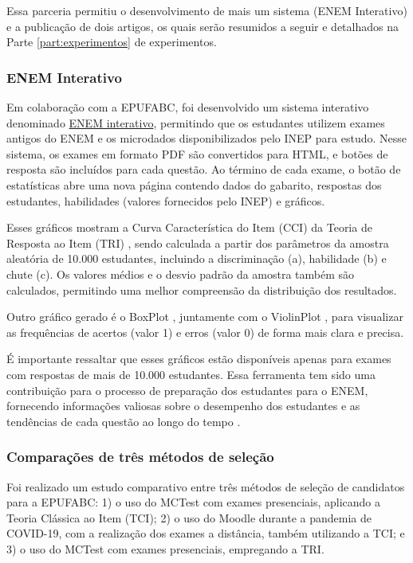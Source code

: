 Essa parceria permitiu o desenvolvimento de mais um sistema (ENEM Interativo) e a publicação de dois artigos, os quais serão resumidos a seguir e detalhados na Parte \ref{part:experimentos} de experimentos.

\subsubsection{ENEM Interativo}\label{sec:enemInterativo}

Em colaboração com a EPUFABC, foi desenvolvido um sistema interativo denominado \href{http://mctest.ufabc.edu.br:8000/ENEM}{ENEM interativo}, permitindo que os estudantes utilizem exames antigos do ENEM e os microdados disponibilizados pelo INEP para estudo. Nesse sistema, os exames em formato PDF são convertidos para HTML, e botões de resposta são incluídos para cada questão. Ao término de cada exame, o botão de estatísticas abre uma nova página contendo dados do gabarito, respostas dos estudantes, habilidades (valores fornecidos pelo INEP) e gráficos.

Esses gráficos mostram a Curva Característica do Item (CCI) da Teoria de Resposta ao Item (TRI) \cite{birnbaum1968some}, sendo calculada a partir dos parâmetros da amostra aleatória de 10.000 estudantes, incluindo a discriminação (a), habilidade (b) e chute (c). Os valores médios e o desvio padrão da amostra também são calculados, permitindo uma melhor compreensão da distribuição dos resultados.

Outro gráfico gerado é o BoxPlot \cite{jw1977exploratory}, juntamente com o ViolinPlot \cite{hintze1998violin}, para visualizar as frequências de acertos (valor 1) e erros (valor 0) de forma mais clara e precisa.

É importante ressaltar que esses gráficos estão disponíveis apenas para exames com respostas de mais de 10.000 estudantes. Essa ferramenta tem sido uma contribuição para o processo de preparação dos estudantes para o ENEM, fornecendo informações valiosas sobre o desempenho dos estudantes e as tendências de cada questão ao longo do tempo \cite{2021:Zampirolli.Junior.ea}.

\subsubsection{Comparações de três métodos de seleção}

Foi realizado um estudo comparativo entre três métodos de seleção de candidatos para a EPUFABC: 1) o uso do MCTest com exames presenciais, aplicando a Teoria Clássica ao Item (TCI); 2) o uso do Moodle durante a pandemia de COVID-19, com a realização dos exames a distância, também utilizando a TCI; e 3) o uso do MCTest com exames presenciais, empregando a TRI. 

